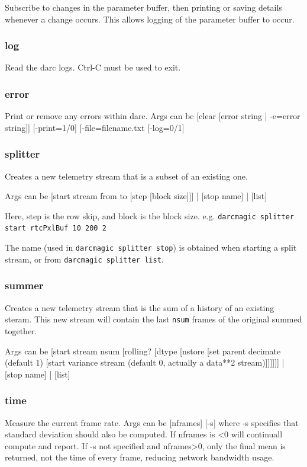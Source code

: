 \documentclass[a4,10pt]{article}
\begin{document}
Subscribe to changes in the parameter buffer, then printing or saving
details whenever a change occurs.  This allows logging of the
parameter buffer to occur.

\subsubsection{log}
Read the darc logs.  Ctrl-C must be used to exit.

\subsubsection{error}
Print or remove any errors within darc.  Args can be [clear [error string |
    -e=error string]] [-print=1/0] [-file=filename.txt [-log=0/1]

\subsubsection{splitter}
Creates a new telemetry stream that is a subset of an existing one.

Args can be [start stream from to [step [block size]]] | [stop name] |
[list]

Here, step is the row skip, and block is the block size.  e.g.
{\tt darcmagic splitter start rtcPxlBuf 10 200 2}

The name (used in {\tt darcmagic splitter stop}) is obtained when
starting a split stream, or from {\tt darcmagic splitter list}.

\subsubsection{summer}
Creates a new telemetry stream that is the sum of a history of an
existing steram.  This new stream will contain the last {\tt nsum}
frames of the original summed together.


Args can be [start stream nsum [rolling? [dtype [nstore [set parent decimate (default 1) [start variance stream (default 0, actually a data**2 stream)]]]]]] | [stop name] | [list]

\subsubsection{time}

Measure the current frame rate.  Args can be [nframes] [-s] where -s
specifies that standard deviation should also be computed.  If nframes
is <0 will continuall compute and report.  If -s not specified and
nframes>0, only the final mean is returned, not the time of every
frame, reducing network bandwidth usage.
\end{document}
